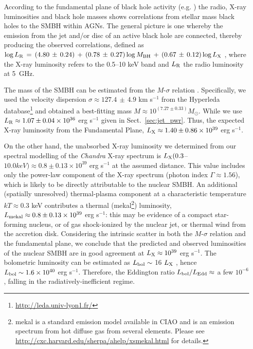 \documentclass[fleqn,usenatbib]{mnras}
\def\sect{Sect.}
\begin{document}
{According to the fundamental plane of black hole activity (e.g. \citealt{Merloni+2003,Falcke+2004,Kordingetal2006b}) the radio, X-ray luminosities and black hole masses shows correlations from stellar mass black holes to the SMBH within AGNs. The general picture is one whereby the emission from the jet and/or disc of an active black hole are connected, thereby producing the observed correlations, defined as $\log L_{\rm R}\,=\,(4.80\,\pm\,0.24)\,+\,(0.78\,\pm\,0.27)\log M_{\rm BH}\,+\,(0.67\,\pm\,0.12)\log L_{\rm X}$ \citep{Gultekinetal2009}, where the X-ray luminosity refers to the 0.5--10 keV band and $L_{\rm R}$ the radio luminosity at 5~GHz.}

The mass of the SMBH can be estimated from the $M$-$\sigma$ relation \citep{vandenBosch2016}. Specifically, we used the velocity dispersion $\sigma \approx 127.4\,\pm\,4.9$ km s$^{-1}$ from the Hyperleda database\footnote{\url{http://leda.univ-lyon1.fr/}} and obtained a best-fitting mass $M \approx 10^{(7.27\pm 0.33)} M_{\odot}$. While we use $L_{\rm R} \approx 1.07 \pm 0.04 \times 10^{36}$ erg s$^{-1}$ given in \sect~\ref{sec:jet_pwr}. Thus, the expected X-ray luminosity from the Fundamental Plane, $L_{\rm X} \approx 1.40 \pm 0.86 \times 10^{39}$ erg s$^{-1}$. 

On the other hand, the unabsorbed X-ray luminosity we determined from our spectral modelling of the 
{\it Chandra} X-ray spectrum is $L_{\rm X} (0.3$--$10.0 keV) \approx 0.8 \pm 0.13 \times 10^{39}$ erg s$^{-1}$ at the assumed 
distance. This value includes only the power-law component of the X-ray spectrum (photon index $\Gamma 
\approx 1.56$), which is likely to be directly attributable to the nuclear SMBH. An additional 
(spatially unresolved) thermal-plasma component at a characteristic temperature $kT \approx 0.3$ keV 
contributes a thermal (mekal\footnote{{mekal is a standard emission model available in CIAO and is an emission spectrum from hot diffuse gas from several elements.  Please see \url{http://cxc.harvard.edu/sherpa/ahelp/xsmekal.html} for details.}}) luminosity, $L_{\rm{mekal}} \approx 0.8 \pm 0.13 \times 10^{39}$ erg s$^{-1}$: this may be evidence 
of a compact star-forming nucleus, or of gas shock-ionized by the nuclear jet, {or thermal wind from the accretion disk}. Considering the 
intrinsic scatter in both the $M$-$\sigma$ relation and the fundamental plane, we conclude that the 
predicted and observed luminosities of the nuclear SMBH are in good agreement at $L_{\rm X} \approx 
10^{39}$ erg s$^{-1}$. The bolometric luminosity can be estimated as  $L_{\rm {bol}} \sim$ {16} $L_{\rm X}$ 
\citep{Ho2008}, hence $L_{\rm {bol}} \sim 1.6 \times 10^{40}$ 
erg s$^{-1}$. Therefore, the Eddington ratio $L_{\rm{bol}}/L_{\rm{Edd}} \approx$ a few $10^{-6}$, 
falling in the radiatively-inefficient regime.
\end{document}
